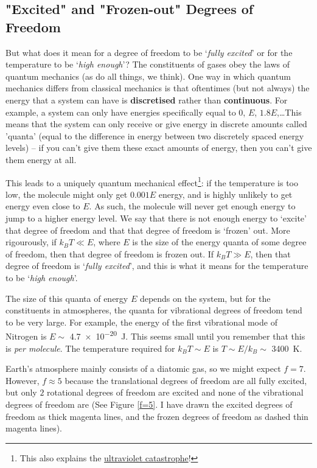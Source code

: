 \subsection{"Excited" and "Frozen-out" Degrees of Freedom}

But what does it mean for a degree of freedom to be `\textit{fully excited}' or for the temperature to be `\textit{high enough}'? The constituents of gases obey the laws of quantum mechanics (as do all things, we think). One way in which quantum mechanics differs from classical mechanics is that oftentimes (but not always) the energy that a system can have is \textbf{discretised} rather than \textbf{continuous}. For example, a system can only have energies specifically equal to $0$, $E$, $1.8E$,\ldots This means that the system can only receive or give energy in discrete amounts called 'quanta' (equal to the difference in energy between two discretely spaced energy levels) – if you can't give them these exact amounts of energy, then you can't give them energy at all.

This leads to a uniquely quantum mechanical effect\footnote{
    This also explains the \href{https://en.wikipedia.org/wiki/Ultraviolet_catastrophe}{ultraviolet catastrophe}!
}: if the temperature is too low, the molecule might only get $0.001E$ energy, and is highly unlikely to get energy even close to $E$. As such, the molecule will never get enough energy to jump to a higher energy level. We say that there is not enough energy to `excite' that degree of freedom and that that degree of freedom is `frozen' out. More rigourously, if $k_BT\ll E$, where $E$ is the size of the energy quanta of some degree of freedom, then that degree of freedom is frozen out. If $k_BT\gg E$, then that degree of freedom is `\textit{fully excited}', and this is what it means for the temperature to be `\textit{high enough}'.

The size of this quanta of energy $E$ depends on the system, but for the constituents in atmospheres, the quanta for vibrational degrees of freedom tend to be very large. For example, the energy of the first vibrational mode of Nitrogen is $E\sim$ \qty{4.7e-20}{\joule}. This seems small until you remember that this is \textit{per molecule}. The temperature required for $k_BT\sim E$ is $T\sim E/k_B\sim$ \qty{3400}{\kelvin}.

Earth's atmosphere mainly consists of a diatomic gas, so we might expect $f=7$. However, $f\approx5$ because the translational degrees of freedom are all fully excited, but only $2$ rotational degrees of freedom are excited and none of the vibrational degrees of freedom are (See Figure \ref{f=5}. I have drawn the excited degrees of freedom as thick magenta lines, and the frozen degrees of freedom as dashed thin magenta lines). 

